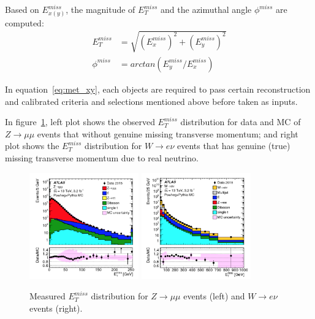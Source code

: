 Based on $E_{x(y)}^{miss}$, the magnitude of $E_{T}^{miss}$ and the azimuthal angle $\phi^{miss}$ are computed:
\begin{equation}
\begin{split}
	E_{T}^{miss} &= \sqrt{ \left(E_{x}^{miss}\right)^{2} + \left(E_{y}^{miss}\right)^{2} } \\
	\phi^{miss} &= arctan \left(E_{y}^{miss}/E_{x}^{miss}\right)
\end{split}
\end{equation}

In equation~\ref{eq:met_xy}, each objects are required to pass certain reconstruction and calibrated criteria and selections mentioned above before taken as inputs.

In figure~\ref{fig:met_dis}, left plot shows the observed $E_{T}^{miss}$ distribution for data and MC of $Z \rightarrow \mu\mu$ events that without genuine missing transverse momentum;
and right plot shows the $E_{T}^{miss}$ distribution for $W \rightarrow e\nu$ events that has genuine (true) missing transverse momentum due to real neutrino.
\begin{figure}[!htb]
  \centering
  \includegraphics[width=0.42\textwidth]{figures/Simulation/met_Zmm.png}
  \includegraphics[width=0.42\textwidth]{figures/Simulation/met_Wev.png}
  \caption{Measured $E_{T}^{miss}$ distribution for $Z \rightarrow \mu\mu$ events (left) and $W \rightarrow e\nu$ events (right). }
  \label{fig:met_dis}
\end{figure}
